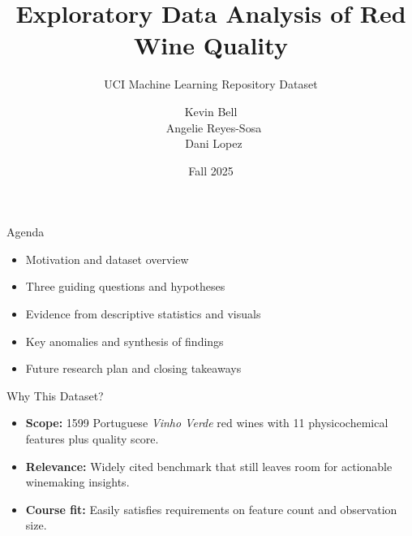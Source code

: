 \documentclass[aspectratio=169]{beamer}
\title{Exploratory Data Analysis of Red Wine Quality}
\subtitle{UCI Machine Learning Repository Dataset}
\author{Kevin Bell \\\ Angelie Reyes-Sosa \\\ Dani Lopez}
\date{Fall 2025}
\begin{document}
\begin{frame}
  \titlepage
\end{frame}

\begin{frame}{Agenda}
  \begin{itemize}
    \item Motivation and dataset overview
    \item Three guiding questions and hypotheses
    \item Evidence from descriptive statistics and visuals
    \item Key anomalies and synthesis of findings
    \item Future research plan and closing takeaways
  \end{itemize}
\end{frame}

\begin{frame}{Why This Dataset?}
  \begin{itemize}
    \item \textbf{Scope:} \num{1599} Portuguese \emph{Vinho Verde} red wines with \num{11} physicochemical features plus quality score.
    \item \textbf{Relevance:} Widely cited benchmark that still leaves room for actionable winemaking insights.
    \item \textbf{Course fit:} Easily satisfies requirements on feature count and observation size.
  \end{itemize}
\end{frame}
\end{document}
